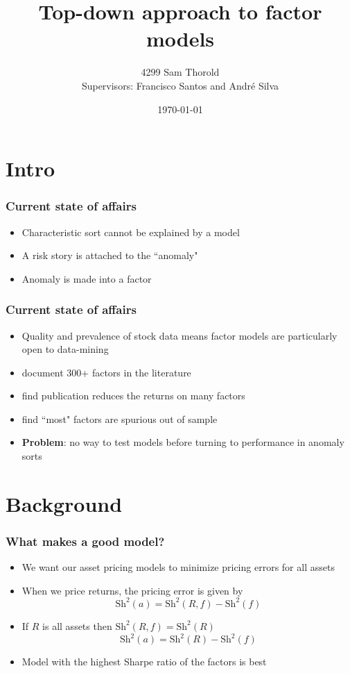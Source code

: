 \documentclass{beamer}
\title[Asset-Pricing]{Top-down approach to factor models}
\author[Thorold]{4299 Sam Thorold\\
                 Supervisors: Francisco Santos and Andr\'e Silva}
\institute{NHH and NOVA}
\date[April 2018]{\today}
\begin{document}
\frame{\titlepage}



\section{Intro}

\begin{frame}
  \frametitle{Current state of affairs}
  \begin{itemize}
    \item Characteristic sort cannot be explained by a model
    \item A risk story is attached to the ``anomaly"
    \item Anomaly is made into a factor
  \end{itemize}
\end{frame}

\begin{frame}
  \frametitle{Current state of affairs}
  \begin{itemize}
    \item Quality and prevalence of stock data means factor models are
    particularly open to data-mining
    \item \textcite{harvey2016and} document 300+ factors in the literature
    \item \textcite{mclean2016does} find publication reduces the returns on
    many factors
    \item \textcite{linnainmaa2016history} find ``most" factors are spurious
    out of sample
    \item \textbf{Problem}:
    no way to test models before turning to performance in anomaly sorts
  \end{itemize}
\end{frame}

\section{Background}

\begin{frame}
\frametitle{What makes a good model?}
\begin{itemize}
    \item<1-> We want our asset pricing models to minimize pricing errors for
    all assets
    \item<1-> When we price returns, the pricing error is given by
    \[
    \text{Sh}^2(a) = \text{Sh}^2(R, f) - \text{Sh}^2(f)
    \]
    \item<2-> If $R$ is all assets then $\text{Sh}^2(R, f) = \text{Sh}^2(R)$
    \[
    \text{Sh}^2(a) = \text{Sh}^2(R) - \text{Sh}^2(f)
    \]
    \item<2->Model with the highest Sharpe ratio of the factors is best
\end{itemize}
\end{frame}
\end{document}
